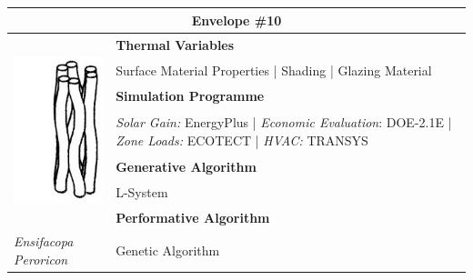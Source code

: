 \begin{table}
	\begin{tabular}{ | m{6cm} | m{14cm} |}
	\toprule
	\multicolumn{2}{c}{Envelope \#{}10} \\[1cm] \hline
	\multirow{7}{*}{\includegraphics[height=5.5cm]{./Images/19-Envelope10}} & \textbf{Thermal Variables} \\[1cm]
	& Surface Material Properties | Shading | Glazing Material\vspace{0.5cm}\\ \cline{2-2}
		 & \textbf{Simulation Programme} \\[1cm]
		 & \emph{Solar Gain:} EnergyPlus | \emph{Economic Evaluation}: DOE-2.1E | \emph{Zone Loads:} ECOTECT | \emph{HVAC:} TRANSYS \vspace{0.5cm}\\ \cline{2-2}
		 & \textbf{Generative Algorithm} \\[1cm]
		 & L-System\vspace{0.5cm}\\ \cline{2-2}
		 & \textbf{Performative Algorithm} \\[1cm]
		 \emph{Ensifacopa Peroricon} &  Genetic Algorithm\vspace{0.5cm}\\
	\bottomrule
	\end{tabular}
\end{table}

\clearpage

